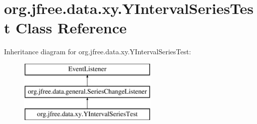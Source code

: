 \hypertarget{classorg_1_1jfree_1_1data_1_1xy_1_1_y_interval_series_test}{}\section{org.\+jfree.\+data.\+xy.\+Y\+Interval\+Series\+Test Class Reference}
\label{classorg_1_1jfree_1_1data_1_1xy_1_1_y_interval_series_test}
Inheritance diagram for org.\+jfree.\+data.\+xy.\+Y\+Interval\+Series\+Test\+:\begin{figure}[H]
\begin{center}
\leavevmode
\includegraphics[height=3.000000cm]{classorg_1_1jfree_1_1data_1_1xy_1_1_y_interval_series_test}
\end{center}
\end{figure}
